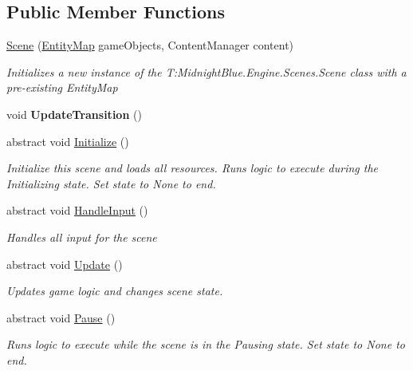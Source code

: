 \subsection*{Public Member Functions}
\begin{DoxyCompactItemize}
\item 
\hyperlink{class_midnight_blue_1_1_engine_1_1_scenes_1_1_scene_ae99d5a05cb0441676e6a41cd502eb0a4}{Scene} (\hyperlink{class_midnight_blue_1_1_engine_1_1_entity_component_1_1_entity_map}{Entity\+Map} game\+Objects, Content\+Manager content)
\begin{DoxyCompactList}\small\item\em Initializes a new instance of the T\+:\+Midnight\+Blue.\+Engine.\+Scenes.\+Scene class with a pre-\/existing Entity\+Map \end{DoxyCompactList}\item 
\hypertarget{class_midnight_blue_1_1_engine_1_1_scenes_1_1_scene_a50cfea87875dc25033f84990f8b37dc4}{}\label{class_midnight_blue_1_1_engine_1_1_scenes_1_1_scene_a50cfea87875dc25033f84990f8b37dc4} 
void {\bfseries Update\+Transition} ()
\item 
abstract void \hyperlink{class_midnight_blue_1_1_engine_1_1_scenes_1_1_scene_aa919101862c14384b955d91a4d3362ab}{Initialize} ()
\begin{DoxyCompactList}\small\item\em Initialize this scene and loads all resources. Runs logic to execute during the Initializing state. Set state to None to end. \end{DoxyCompactList}\item 
abstract void \hyperlink{class_midnight_blue_1_1_engine_1_1_scenes_1_1_scene_a2f7849ef8976f9aeed0023448033b6fd}{Handle\+Input} ()
\begin{DoxyCompactList}\small\item\em Handles all input for the scene \end{DoxyCompactList}\item 
abstract void \hyperlink{class_midnight_blue_1_1_engine_1_1_scenes_1_1_scene_a4e37ff3d5362a8ad5c0d82d7c990dfdf}{Update} ()
\begin{DoxyCompactList}\small\item\em Updates game logic and changes scene state. \end{DoxyCompactList}\item 
abstract void \hyperlink{class_midnight_blue_1_1_engine_1_1_scenes_1_1_scene_aeb3c4d9bea0177d21fbffcdabab660de}{Pause} ()
\begin{DoxyCompactList}\small\item\em Runs logic to execute while the scene is in the Pausing state. Set state to None to end. \end{DoxyCompactList}\item 

\end{DoxyCompactItemize}
